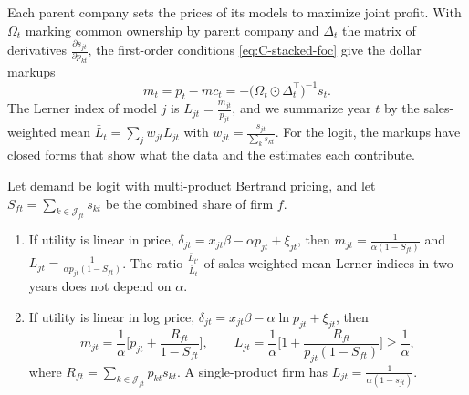 Each parent company sets the prices of its models to maximize joint profit. With $\Omega_t$ marking common ownership by
parent company and $\Delta_t$ the matrix of derivatives $\frac{\partial s_{jt}}{\partial p_{kt}}$, the first-order
conditions \eqref{eq:C-stacked-foc} give the dollar markups
\begin{equation}\label{eq:C-autos-markup}
  m_t = p_t - mc_t = -\big(\Omega_t \odot \Delta_t^\top\big)^{-1}s_t .
\end{equation}
The Lerner index of model $j$ is $L_{jt} = \frac{m_{jt}}{p_{jt}}$, and we summarize year $t$ by the sales-weighted
mean $\bar L_t = \sum_jw_{jt}L_{jt}$ with $w_{jt} = \frac{s_{jt}}{\sum_ks_{kt}}$. For the logit, the markups have closed
forms that show what the data and the estimates each contribute.

\begin{proposition}\label{prop:C-logit-lerner}
Let demand be logit with multi-product Bertrand pricing, and let $S_{ft} = \sum_{k \in \mathcal{J}_{ft}}s_{kt}$ be the
combined share of firm $f$.
\begin{enumerate}[label=(\roman*)]
  \item If utility is linear in price, $\delta_{jt} = x_{jt}\beta - \alpha p_{jt} + \xi_{jt}$, then
  $m_{jt} = \frac{1}{\alpha(1 - S_{ft})}$ and $L_{jt} = \frac{1}{\alpha p_{jt}(1 - S_{ft})}$. The ratio
  $\frac{\bar L_{t'}}{\bar L_t}$ of sales-weighted mean Lerner indices in two years does not depend on $\alpha$.
  \item If utility is linear in log price, $\delta_{jt} = x_{jt}\beta - \alpha\ln p_{jt} + \xi_{jt}$, then
  \begin{equation}\label{eq:C-logprice-markup}
    m_{jt} = \frac{1}{\alpha}\Big[p_{jt} + \frac{R_{ft}}{1 - S_{ft}}\Big] , \qquad
    L_{jt} = \frac{1}{\alpha}\Big[1 + \frac{R_{ft}}{p_{jt}(1 - S_{ft})}\Big] \ge \frac{1}{\alpha} ,
  \end{equation}
  where $R_{ft} = \sum_{k \in \mathcal{J}_{ft}}p_{kt}s_{kt}$. A single-product firm has $L_{jt} = \frac{1}{\alpha(1 -
  s_{jt})}$.
\end{enumerate}
\end{proposition}

